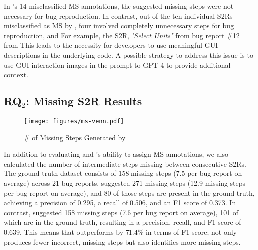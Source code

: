 In \EulerC's 14 misclassified MS annotations, the suggested missing steps were not necessary for bug reproduction. 
In contrast, out of the ten individual S2Rs misclassified as MS by \tool, four involved completely unnecessary steps for bug reproduction, and  
For example, the S2R, \textit{"Select Units"} from bug report \#12 from  This leads to the necessity for developers to use meaningful GUI descriptions in the underlying code. A possible strategy to address this issue is to use GUI interaction images in the prompt to GPT-4 to provide additional context. 

\subsection{RQ$_2$: Missing S2R Results}

\begin{figure}[t]
	\vspace{-1em}
	\centering
	\texttt{[image: figures/ms-venn.pdf]}
	\caption{\# of Missing Steps Generated by \tool}
	\label{fig:ms-venn}
	\vspace{-0.3cm}
\end{figure}

In addition to evaluating \EulerC and \tool's ability to assign MS annotations, we also calculated the number of intermediate steps missing between  consecutive S2Rs. The ground truth dataset consists of 158 missing steps (7.5 per bug report on average) across 21 bug reports. \EulerC suggested 271 missing steps (12.9 missing steps per bug report on average), and 80 of those steps are present in the ground truth, achieving a precision of 0.295, a recall of 0.506, and an F1 score of 0.373. In contrast, \tool suggested 158 missing steps (7.5 per bug report on average), 101 of which are in the ground truth, resulting in a precision, recall, and F1 score of 0.639. This means that \tool outperforms \EulerC by 71.4\% in terms of F1 score;  \tool not only produces fewer incorrect, missing steps but also identifies more  missing steps.


